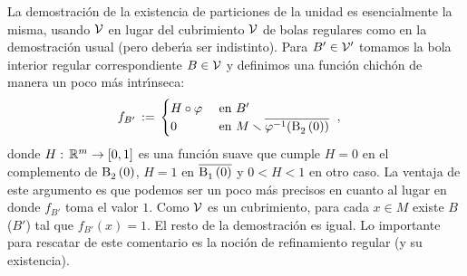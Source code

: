 La demostraci\'{o}n de la existencia de particiones de la unidad es
esencialmente la misma, usando $\cal V$ en lugar del cubrimiento $\cal V$ de
bolas regulares como en la demostraci\'{o}n usual (pero deber\'{\i}a ser
indistinto). Para $B'\in\cal V'$ tomamos la bola interior regular
correspondiente $B\in\cal V$ y definimos una funci\'{o}n chich\'{o}n de manera
un poco m\'{a}s intr\'{\i}nseca:
\begin{align*}
	f_{B'} & \,:=\,
		\begin{cases}
			H\circ\varphi & \text{ en }B' \\
			0 & \text{ en } M\setmin
				\clos{\varphi^{-1}(\bola{2}{0})}
		\end{cases}
	\text{ ,}
\end{align*}
%
donde $H:\,\bb R^m\rightarrow [0,1]$ es una funci\'{o}n suave que cumple
$H=0$ en el complemento de $\bola{2}{0}$, $H=1$ en $\clos{\bola{1}{0}}$ y
$0<H<1$ en otro caso. La ventaja de este argumento es que podemos ser un poco
m\'{a}s precisos en cuanto al lugar en donde $f_{B'}$ toma el valor $1$. Como
$\cal V$ es un cubrimiento, para cada $x\in M$ existe $B$ ($B'$) tal que
$f_{B'}(x)=1$. El resto de la demostraci\'{o}n es igual. Lo importante para
rescatar de este comentario es la noci\'{o}n de refinamiento regular (y su
existencia).
